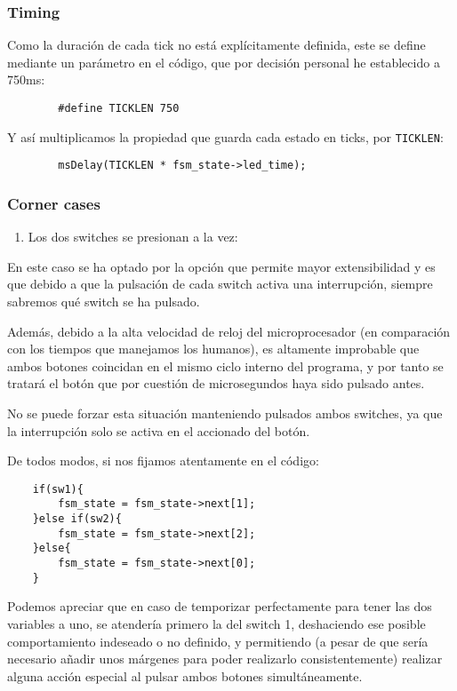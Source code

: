 \documentclass[a4paper,openright,12pt]{article}
\begin{document}
\subsubsection{Timing}\label{ticklen_duration}
Como la duración de cada tick no está explícitamente definida, este se define mediante un parámetro en el código, que por decisión personal
he establecido a 750ms:
\begin{verbatim}
        #define TICKLEN 750
\end{verbatim}

Y así multiplicamos la propiedad que guarda cada estado en ticks, por \texttt{TICKLEN}:
\begin{verbatim}
        msDelay(TICKLEN * fsm_state->led_time);
\end{verbatim}

\subsubsection{Corner cases}
\begin{enumerate}
    \item Los dos switches se presionan a la vez:
\end{enumerate}
En este caso se ha optado por la opción que permite mayor extensibilidad y es que debido a que la pulsación de cada switch activa una interrupción,
siempre sabremos qué switch se ha pulsado.

Además, debido a la alta velocidad de reloj del microprocesador (en comparación con los tiempos que manejamos los humanos), es altamente improbable que ambos botones coincidan
en el mismo ciclo interno del programa, y por tanto se tratará el botón que por cuestión de microsegundos haya sido pulsado antes.

No se puede forzar esta situación manteniendo pulsados ambos switches, ya que la interrupción solo se activa en el accionado del botón.

De todos modos, si nos fijamos atentamente en el código:

\begin{verbatim}
    if(sw1){
        fsm_state = fsm_state->next[1];
    }else if(sw2){
        fsm_state = fsm_state->next[2];
    }else{
        fsm_state = fsm_state->next[0];
    }
\end{verbatim}

Podemos apreciar que en caso de temporizar perfectamente para tener las dos variables a uno, se atendería primero la del switch 1, deshaciendo ese posible comportamiento
indeseado o no definido, y permitiendo (a pesar de que sería necesario añadir unos márgenes para poder realizarlo consistentemente) realizar alguna acción especial al pulsar ambos
botones simultáneamente.
\end{document}

